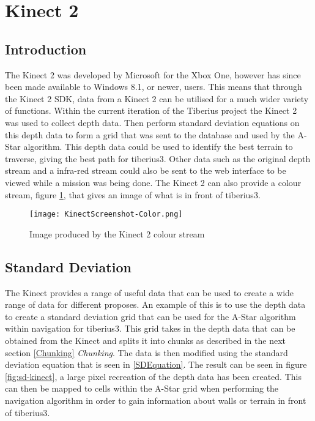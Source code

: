 \section{Kinect 2}

\subsection{Introduction}
The Kinect 2 was developed by Microsoft for the Xbox One, however has since been made available to Windows 8.1, or newer, users. This means that through the Kinect 2 SDK, data from a Kinect 2 can be utilised for a much wider variety of functions. Within the current iteration of the Tiberius project the Kinect 2 was used to collect depth data. Then perform standard deviation equations on this depth data to form a grid that was sent to the database and used by the A-Star algorithm. This depth data could be used to identify the best terrain to traverse, giving the best path for \gls{tiberius3}. Other data such as the original depth stream and a infra-red stream could also be sent to the web interface to be viewed while a mission was being done. The Kinect 2 can also provide a colour stream, figure \ref{fig:kinect-color}, that gives an image of what is in front of \gls{tiberius3}.

\begin{figure}[!htb]
\begin{center}
\texttt{[image: KinectScreenshot-Color.png]}
\end{center}
\caption{Image produced by the Kinect 2 colour stream}
\label{fig:kinect-color}
\end{figure}


\subsection{Standard Deviation}\label{StandardDeviation}
The Kinect provides a range of useful data that can be used to create a wide range of data for different proposes. An example of this is to use the depth data to create a standard deviation grid that can be used for the A-Star algorithm within navigation for \gls{tiberius3}. This grid takes in the depth data that can be obtained from the Kinect and splits it into chunks as described in the next section \ref{Chunking} \textit{Chunking}. The data is then modified using the standard deviation equation that is seen in \ref{SDEquation}. The result can be seen in figure \ref{fig:sd-kinect}, a large pixel recreation of the depth data has been created. This can then be mapped to cells within the A-Star grid when performing the navigation algorithm in order to gain information about walls or terrain in front of \gls{tiberius3}.

